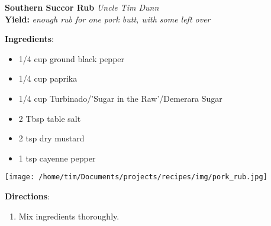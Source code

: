 \documentclass[11pt, twoside, openany]{book}
\begin{document}
\noindent\begin{minipage}[t]{\linewidth}%
{\Large\textbf{Southern Succor Rub}} \label{southern-succor-rub}\hfill\textit{Uncle Tim Dunn}\\
\textbf{Yield:} \textit{enough rub for one pork butt, with some left over}\\
\noindent\begin{minipage}[t]{0.78\linewidth}%
\textbf{Ingredients}:\vspace{-3mm}
\begin{multicols}{2}
\begin{itemize}\setlength\itemsep{-1mm}
\item 1/4 cup ground black pepper
\item 1/4 cup paprika
\item 1/4 cup Turbinado/'Sugar in the Raw'/Demerara Sugar
\item 2 Tbsp table salt
\item 2 tsp dry mustard
\item 1 tsp cayenne pepper
\end{itemize}
\end{multicols}
\end{minipage}
\noindent\begin{minipage}[t]{0.18\linewidth}
\centering \strut\vspace*{-\baselineskip}\newline
\texttt{[image: /home/tim/Documents/projects/recipes/img/pork\_rub.jpg]}\\
\end{minipage}\vspace{3mm}
\textbf{Directions}:
\vspace{-3mm}\begin{enumerate}\setlength\itemsep{-1mm}
\item Mix ingredients thoroughly.
\end{enumerate}
\end{minipage}\vspace{8mm}
\end{document}
